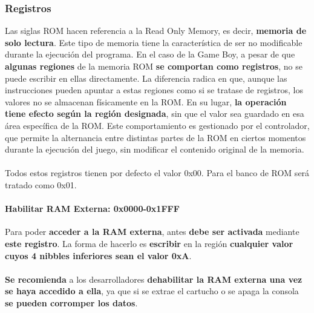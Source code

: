 \subsubsection{Registros}

Las siglas ROM hacen referencia a la Read Only Memory, es decir, \textbf{memoria de solo lectura}. Este tipo de memoria tiene la característica de ser no modificable durante la ejecución del programa. En el caso de la Game Boy, a pesar de que \textbf{algunas regiones} de la memoria ROM \textbf{se comportan como registros}, no se puede escribir en ellas directamente. La diferencia radica en que, aunque las instrucciones pueden apuntar a estas regiones como si se tratase de registros, los valores no se almacenan físicamente en la ROM. En su lugar, \textbf{la operación tiene efecto según la región designada}, sin que el valor sea guardado en esa área específica de la ROM. Este comportamiento es gestionado por el controlador, que permite la alternancia entre distintas partes de la ROM en ciertos momentos durante la ejecución del juego, sin modificar el contenido original de la memoria.
\\\\
Todos estos registros tienen por defecto el valor 0x00. Para el banco de ROM será tratado como 0x01.

\paragraph{Habilitar RAM Externa: 0x0000-0x1FFF}
Para poder \textbf{acceder a la RAM externa}, antes \textbf{debe ser activada} mediante \textbf{este registro}. La forma de hacerlo es \textbf{escribir} en la región \textbf{cualquier valor cuyos 4 nibbles inferiores sean el valor 0xA}.
\\\\
\textbf{Se recomienda} a los desarrolladores \textbf{dehabilitar la RAM externa una vez se haya accedido a ella}, ya que si se extrae el cartucho o se apaga la consola \textbf{se pueden corromper los datos}.

